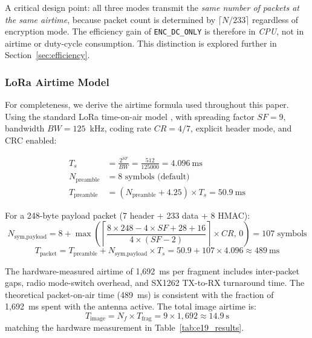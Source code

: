 \documentclass[journal]{IEEEtran}
\begin{document}
A critical design point: all three modes transmit the \emph{same number of
packets at the same airtime}, because packet count is determined by
$\lceil N / 233 \rceil$ regardless of encryption mode.  The efficiency gain of
\texttt{ENC\_DC\_ONLY} is therefore in \emph{CPU}, not in airtime or duty-cycle
consumption.  This distinction is explored further in
Section~\ref{sec:efficiency}.

\subsubsection{LoRa Airtime Model}

For completeness, we derive the airtime formula used throughout this paper.
Using the standard LoRa time-on-air model \cite{semtech_sx1262}, with spreading
factor $\mathit{SF} = 9$, bandwidth $\mathit{BW} = 125$~kHz, coding rate
$\mathit{CR} = 4/7$, explicit header mode, and CRC enabled:

\begin{align}
  T_s &= \frac{2^{SF}}{BW} = \frac{512}{125000} = 4.096~\text{ms}
  \label{eq:Ts} \\
  N_{\text{preamble}} &= 8 \text{ symbols (default)} \nonumber \\
  T_{\text{preamble}} &= (N_{\text{preamble}} + 4.25) \times T_s = 50.9~\text{ms}
  \label{eq:Tpreamble}
\end{align}

For a 248-byte payload packet (7 header + 233 data + 8 HMAC):
\begin{equation}
  N_{\text{sym,payload}} =
    8 + \max\!\!\left(
      \left\lceil
        \frac{8 \times 248 - 4 \times SF + 28 + 16}{4 \times (SF-2)}
      \right\rceil \times CR,\, 0
    \right) = 107 \text{ symbols}
  \label{eq:Nsym}
\end{equation}
\begin{equation}
  T_{\text{packet}} = T_{\text{preamble}} + N_{\text{sym,payload}} \times T_s
    = 50.9 + 107 \times 4.096 \approx 489~\text{ms}
  \label{eq:Tpacket}
\end{equation}

The hardware-measured airtime of 1{,}692~ms per fragment includes inter-packet
gaps, radio mode-switch overhead, and SX1262 TX-to-RX turnaround time.  The
theoretical packet-on-air time (489~ms) is consistent with the fraction of
1{,}692~ms spent with the antenna active.  The total image airtime is:
\begin{equation}
  T_{\text{image}} = N_f \times T_{\text{frag}} = 9 \times 1{,}692 \approx 14.9~\text{s}
  \label{eq:Timage}
\end{equation}
matching the hardware measurement in Table~\ref{tab:e19_results}.
\end{document}

